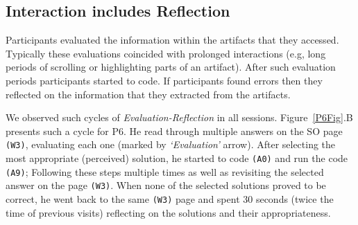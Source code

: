 



\subsection{Interaction includes Reflection}


Participants evaluated the information within the artifacts that they accessed. Typically these evaluations coincided with prolonged interactions (e.g, long periods of scrolling or highlighting parts of an artifact). After such evaluation periods participants started to code. If participants found errors then they reflected on the information that they extracted from the artifacts.

We observed such cycles of \textit{Evaluation-Reflection} in all sessions. Figure~\ref{P6Fig}.B presents such a cycle for P6. He read through multiple answers on the SO page \texttt{(W3)}, evaluating each one (marked by \textit{`Evaluation'} arrow). After selecting the most appropriate (perceived) solution, he started to code \texttt{(A0)} and run the code \texttt{(A9)}; Following these steps multiple times as well as revisiting the selected answer on the page \texttt{(W3)}. When none of the selected solutions proved to be correct, he went back to the same \texttt{(W3)} page and spent 30 seconds (twice the time of previous visits) reflecting on the solutions and their appropriateness.

